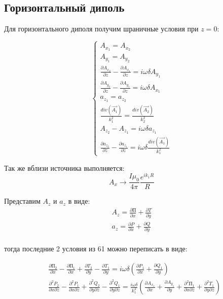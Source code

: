 	\newpage
	
	\subsection{Горизонтальный диполь}
	
	Для горизонтального диполя получим шраничные условия при $z = 0$:
	
	\begin{equation}
		\begin{cases}
			A_{x_1} = A_{x_2} \\
			A_{y_1} = A_{y_2} \\
			\frac{\partial A_{x_2}}{\partial z} - \frac{\partial A_{x_1}}{\partial z} = i \omega \delta A_{y_1} \\
			\frac{\partial A_{y_2}}{ \partial z} - \frac{\partial A_{y_1}}{\partial z} = i \omega \delta A_{x_1} \\
			a_{z_1} = a_{z_2} \\
			\frac{div(\vec{A_1})}{k_1^2} = \frac{div(\vec{A_2})}{k_2^2} \\
			A_{z_2} - A_{z_1} = i \omega \delta a_{z_1} \\
			\frac{\partial a_{z_2}}{\partial z} - \frac{\partial a_{z_1}}{\partial z} = i \omega \delta \frac{div(\vec{A_1})}{k_1^2}
		\end{cases}
	\end{equation}
	
	Так же вблизи источника выполняется:
	\begin{equation}
		A_x \rightarrow \frac{I \mu_0}{4 \pi} \frac{e^{i k_1 R}}{R}
	\end{equation}
	
	Представим $A_z$ и $a_z$ в виде:
	\begin{equation}
		\begin{aligned}
			A_z = \frac{\partial \text{П}}{\partial x} + \frac{\partial T}{\partial y} \\
			a_z = \frac{\partial P}{\partial x} + \frac{\partial Q}{\partial y} \\
		\end{aligned}
	\end{equation}
	
	тогда последние 2 условия из 61 можно переписать в виде:
	
	\begin{equation}
		\begin{aligned}
			&\frac{\partial \text{П}_2}{\partial x} - \frac{\partial \text{П}_1}{\partial x} + \frac{\partial T_2}{\partial y} - \frac{\partial T_1}{\partial y} = i \omega \delta (\frac{\partial P_1}{\partial x} + \frac{\partial Q_1}{\partial y}) \\
			&\frac{\partial^2 P_2}{\partial x \partial z} - \frac{\partial^2 P_1}{\partial x \partial z} + \frac{\partial^2 Q_2}{\partial y \partial z} - \frac{\partial^2 Q_1}{\partial y \partial z} = \frac{i \omega \delta}{k_1^2} (\frac{\partial A_{x_1}}{\partial x} + \frac{\partial A_{y_1}}{\partial y} + \frac{\partial^2 \textit{П}_1}{\partial x \partial z} + \frac{\partial ^ 2 T_1}{\partial y \partial z} )
		\end{aligned}
	\end{equation} 
	
